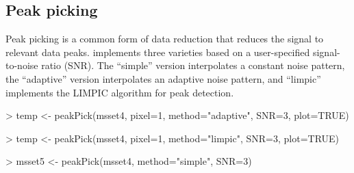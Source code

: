 \documentclass[a4paper]{article}
\begin{document}
\subsection{Peak picking}

Peak picking is a common form of data reduction that reduces the signal to relevant data peaks.  implements three varieties based on a user-specified signal-to-noise ratio (SNR). The ``simple'' version interpolates a constant noise pattern, the ``adaptive'' version interpolates an adaptive noise pattern, and ``limpic'' implements the LIMPIC algorithm for peak detection.
\begin{Schunk}
\begin{Sinput}
> temp <- peakPick(msset4, pixel=1, method="adaptive", SNR=3, plot=TRUE)
\end{Sinput}
\end{Schunk}
\begin{Schunk}
\begin{Sinput}
> temp <- peakPick(msset4, pixel=1, method="limpic", SNR=3, plot=TRUE)
\end{Sinput}
\end{Schunk}
\begin{Schunk}
\begin{Sinput}
> msset5 <- peakPick(msset4, method="simple", SNR=3)
\end{Sinput}
\end{Schunk}
\end{document}

